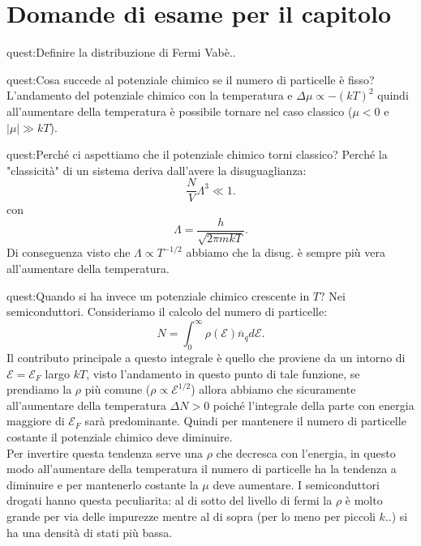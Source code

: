 \clearpage 
\section*{Domande di esame per il capitolo}%
\begin{quest}{quest:Definire la distribuzione di Fermi}
Vabè..
\end{quest}
\begin{quest}{quest:Cosa succede al potenziale chimico se il numero di particelle è fisso?}
    L'andamento del potenziale chimico con la temperatura e $\Delta\mu\propto-\left(kT\right)^{2}$ quindi all'aumentare della temperatura è possibile tornare nel caso classico ($\mu < 0$ e $\left|\mu\right|\gg kT$).
\end{quest}
\begin{quest}{quest:Perché ci aspettiamo che il potenziale chimico torni classico?}
Perché la "classicità" di un sistema deriva dall'avere la disuguaglianza:
\[
    \frac{N}{V}\Lambda^3\ll 1
.\] 
con 
\[
    \Lambda  = \frac{h}{\sqrt{2\pi mkT} }
.\] 
Di conseguenza visto che $\Lambda\propto T^{-1 /2}$ abbiamo che la disug. è sempre più vera all'aumentare della temperatura.
\end{quest}
\begin{quest}{quest:Quando si ha invece un potenziale chimico crescente in $T$?}
Nei semiconduttori. Consideriamo il calcolo del numero di particelle:
\[
    N  = \int_{0}^{\infty}  \rho\left(\mathcal{E}\right)\overline{n}_qd\mathcal{E}
.\] 
Il contributo principale a questo integrale è quello che proviene da un intorno di $\mathcal{E} =\mathcal{E}_F$ largo $kT$, visto l'andamento in questo punto di tale funzione, se prendiamo la $\rho$ più comune ($\rho\propto\mathcal{E}^{1 /2}$) allora abbiamo che sicuramente all'aumentare della temperatura $\Delta N>0$ poiché l'integrale della parte con energia maggiore di $\mathcal{E}_F$ sarà predominante. 
Quindi per mantenere il numero di particelle costante il potenziale chimico deve diminuire. \\
Per invertire questa tendenza serve una $\rho$ che decresca con l'energia, in questo modo all'aumentare della temperatura il numero di particelle ha la tendenza a diminuire e per mantenerlo costante la $\mu$ deve aumentare.
I semiconduttori drogati hanno questa peculiarita: al di sotto del livello di fermi la $\rho$ è molto grande per via delle impurezze mentre al di sopra (per lo meno per piccoli $k$..) si ha una densità di stati più bassa.
\end{quest}
